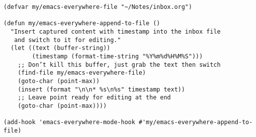 \documentclass[11pt]{article}
\begin{document}
\begin{verbatim}
(defvar my/emacs-everywhere-file "~/Notes/inbox.org")

(defun my/emacs-everywhere-append-to-file ()
  "Insert captured content with timestamp into the inbox file
   and switch to it for editing."
  (let ((text (buffer-string))
        (timestamp (format-time-string "%Y%m%d%H%M%S")))
    ;; Don’t kill this buffer, just grab the text then switch
    (find-file my/emacs-everywhere-file)
    (goto-char (point-max))
    (insert (format "\n\n* %s\n%s" timestamp text))
    ;; Leave point ready for editing at the end
    (goto-char (point-max))))

(add-hook 'emacs-everywhere-mode-hook #'my/emacs-everywhere-append-to-file)
\end{verbatim}
\end{document}
